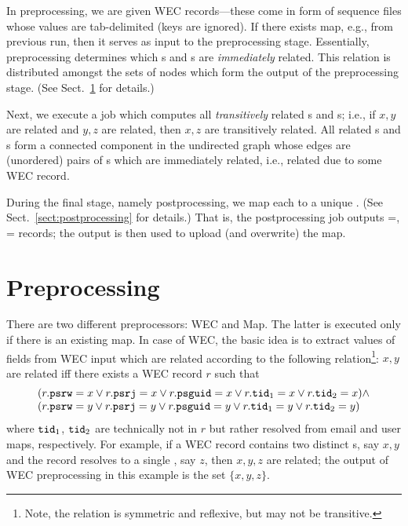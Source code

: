 \documentclass{article}[12pt]
\numberwithin{figure}{section}
\begin{document}
In preprocessing, we are given WEC records---these come in form of sequence files whose values are tab-delimited (keys are ignored).
If there exists {\PSGUID} map, e.g., from previous run, then it serves as input to the preprocessing stage.
Essentially, preprocessing determines which {\PSGUID}s and {\TID}s are \emph{immediately} related.  This relation is distributed amongst the sets of nodes
which form the output of the preprocessing stage.  (See Sect.~\ref{sect:preprocessing} for details.)

Next, we execute a {\MAPREDUCE} job which computes all \emph{transitively} related {\PSGUID}s and {\TID}s; i.e., if
$x,y$ are related and $y,z$ are related, then $x, z$ are transitively related.
All related {\PSGUID}s and {\TID}s form a connected component in the undirected graph whose edges are (unordered) pairs
of {\PSGUID}s which are immediately related, i.e., related due to some WEC record.

During the final stage, namely postprocessing, we map each {\PSGUID} to a unique {\TID}.  (See Sect.~\ref{sect:postprocessing}
for details.)  
That is, the postprocessing job outputs
\KEY={\PSGUID}, \VALUE={\TID} records; the output is then used to upload (and overwrite) the {\PSGUID} map.

\section{Preprocessing}\label{sect:preprocessing}

There are two different preprocessors: WEC and Map.  The latter is executed only if there is an existing {\PSGUID} map.
In case of WEC, the basic idea is to extract values of fields from WEC input which are related according to the following relation\footnote{Note, the relation
is symmetric and reflexive, but may not be transitive.}: 
$x, y$ are related iff there exists a WEC record $r$ such that
\[
\begin{array}{l}
(r.\texttt{psrw} = x \lor r.\texttt{psrj} = x \lor r.\texttt{psguid} = x \lor r.\texttt{tid}_1 = x \lor r.\texttt{tid}_2 = x) \land\\
(r.\texttt{psrw} = y \lor r.\texttt{psrj} = y \lor r.\texttt{psguid} = y \lor r.\texttt{tid}_1 = y \lor r.\texttt{tid}_2 = y)
\end{array}
\]
where $\texttt{tid}_1$, $\texttt{tid}_2$ are technically not in $r$ but rather resolved from email and user maps, respectively.
For example, if a WEC record contains two distinct {\PSGUID}s, say $x, y$ and the record resolves to a single {\TID}, say $z$,
then $x,y,z$ are related; the output of WEC preprocessing in this example is the set $\{x,y,z\}$.
\end{document}
